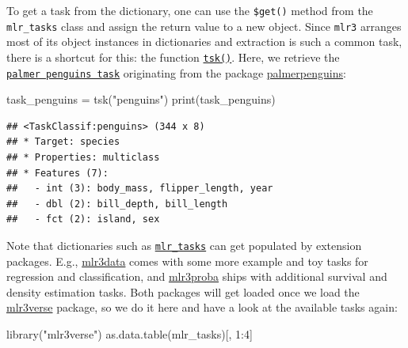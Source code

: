 \documentclass[
]{scrbook}
\newenvironment{Shaded}{\begin{snugshade}}{\end{snugshade}}
\newcommand{\DecValTok}[1]{\textcolor[rgb]{0.00,0.00,0.81}{#1}}
\newcommand{\FunctionTok}[1]{\textcolor[rgb]{0.00,0.00,0.00}{#1}}
\newcommand{\NormalTok}[1]{#1}
\newcommand{\OtherTok}[1]{\textcolor[rgb]{0.56,0.35,0.01}{#1}}
\newcommand{\SpecialCharTok}[1]{\textcolor[rgb]{0.00,0.00,0.00}{#1}}
\newcommand{\StringTok}[1]{\textcolor[rgb]{0.31,0.60,0.02}{#1}}
\renewenvironment{Shaded} {\begin{snugshade}\small} {\end{snugshade}}
\begin{document}
To get a task from the dictionary, one can use the \texttt{\$get()} method from the \texttt{mlr\_tasks} class and assign the return value to a new object.
Since \texttt{mlr3} arranges most of its object instances in dictionaries and extraction is such a common task, there is a shortcut for this: the function \href{https://mlr3.mlr-org.com/reference/mlr_sugar.html}{\texttt{tsk()}}.
Here, we retrieve the \href{https://mlr3.mlr-org.com/reference/mlr_tasks_penguins.html}{\texttt{palmer\ penguins\ task}} originating from the package \href{https://cran.r-project.org/package=palmerpenguins}{palmerpenguins}:

\begin{Shaded}
\begin{Highlighting}[]
\NormalTok{task\_penguins }\OtherTok{=} \FunctionTok{tsk}\NormalTok{(}\StringTok{"penguins"}\NormalTok{)}
\FunctionTok{print}\NormalTok{(task\_penguins)}
\end{Highlighting}
\end{Shaded}

\begin{verbatim}
## <TaskClassif:penguins> (344 x 8)
## * Target: species
## * Properties: multiclass
## * Features (7):
##   - int (3): body_mass, flipper_length, year
##   - dbl (2): bill_depth, bill_length
##   - fct (2): island, sex
\end{verbatim}

Note that dictionaries such as \href{https://mlr3.mlr-org.com/reference/mlr_tasks.html}{\texttt{mlr\_tasks}} can get populated by extension packages.
E.g., \href{https://mlr3data.mlr-org.com}{mlr3data} comes with some more example and toy tasks for regression and classification, and \href{https://mlr3proba.mlr-org.com}{mlr3proba} ships with additional survival and density estimation tasks.
Both packages will get loaded once we load the \href{https://mlr3verse.mlr-org.com}{mlr3verse} package, so we do it here and have a look at the available tasks again:

\begin{Shaded}
\begin{Highlighting}[]
\FunctionTok{library}\NormalTok{(}\StringTok{"mlr3verse"}\NormalTok{)}
\FunctionTok{as.data.table}\NormalTok{(mlr\_tasks)[, }\DecValTok{1}\SpecialCharTok{:}\DecValTok{4}\NormalTok{]}
\end{Highlighting}
\end{Shaded}
\end{document}
